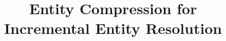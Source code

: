 \documentclass{vldb}
\title{Entity Compression for Incremental Entity Resolution}
\author{\alignauthor{Christan Earl Grant}\\
    \affaddr{University of Florida}\\
    \affaddr{Dept.\ of Computer Science}\\
    \affaddr{Gainesville, Florida, USA} \\
    \email{cgrant@cise.ufl.edu}\\
\alignauthor{Daisy Zhe Wang}\\
    \affaddr{University of Florida}\\
    \affaddr{Dept.\ of Computer Science}\\
    \affaddr{Gainesville, Florida, USA}\\
    \email{daisyw@cise.ufl.edu}\\
}
\begin{document}
\maketitle



















{%
  \scriptsize%
  
  
}
\end{document}
